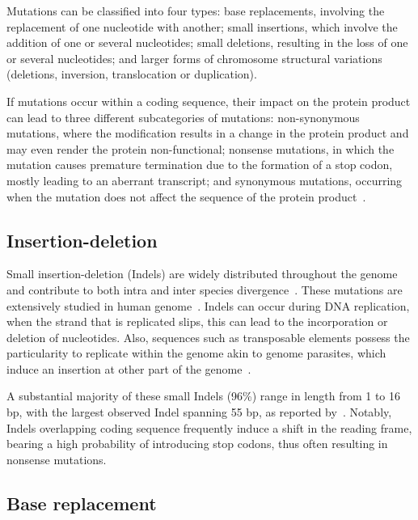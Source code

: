 Mutations can be classified into four types: base replacements, involving the replacement of one nucleotide with another; small insertions, which involve the addition of one or several nucleotides; small deletions, resulting in the loss of one or several nucleotides; and larger forms of chromosome structural variations (deletions, inversion, translocation or duplication).

If mutations occur within a coding sequence, their impact on the protein product can lead to three different subcategories of mutations: \gls{non-synonymous} mutations, where the modification results in a change in the protein product and may even render the protein non-functional; nonsense mutations, in which the mutation causes premature termination due to the formation of a stop \gls{codon}, mostly leading to an aberrant transcript; and synonymous mutations, occurring when the mutation does not affect the sequence of the protein product~\citep{zia_ranking_2011, potapova_nonsense_2022}.

\subsection{Insertion-deletion}

Small insertion-deletion (\acrshort{Indel}s) are widely distributed throughout the genome and contribute to both intra and inter species divergence~\citep{mcgee_ecological_2020}. These mutations are extensively studied in human genome~\citep{weber_human_2002, bhangale_comprehensive_2005, conrad_high-resolution_2006}. Indels can occur during DNA replication, when the strand that is replicated slips, this can lead to the incorporation or deletion of nucleotides. Also, sequences such as transposable elements possess the particularity to replicate within the genome akin to genome parasites, which induce an insertion at other part of the genome~\citep{cai_transposable_2022, mcclintock_origin_1950}.

A substantial majority of these small \acrshort{Indel}s (96\%) range in length from 1 to 16 \acrshort{bp}, with the largest observed \acrshort{Indel} spanning 55 \acrshort{bp}, as reported by~\citet{mullaney_small_2010}. Notably, \acrshort{Indel}s overlapping coding sequence frequently induce a shift in the reading frame, bearing a high probability of introducing stop \gls{codon}s, thus often resulting in nonsense mutations.


\subsection{Base replacement}

